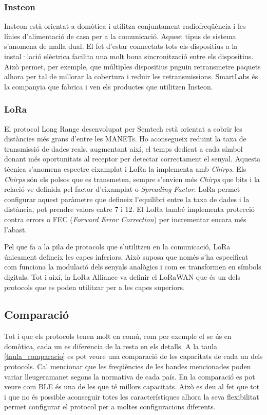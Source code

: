 \subsubsection{Insteon}
Insteon està orientat a domòtica i utilitza conjuntament radiofreqüència i les línies d'alimentació de casa per a la comunicació.
Aquest tipus de sistema s'anomena de malla dual.
El fet d'estar connectats tots els dispositius a la instal·lació elèctrica facilita una molt bona sincronització entre els dispositius.
Això permet, per exemple, que múltiples dispositius puguin retransmetre paquets alhora per tal de millorar la cobertura i reduir les retransmissions.
SmartLabs és la companyia que fabrica i ven els productes que utilitzen Insteon.

\subsubsection{LoRa}
El protocol Long Range desenvolupat per Semtech està orientat a cobrir les distàncies més grans d'entre les MANETs.
Ho aconsegueix reduint la taxa de transmissió de dades reals, augmentant així, el temps dedicat a cada símbol donant més oportunitats al receptor per detectar correctament el senyal.
Aquesta tècnica s'anomena espectre eixamplat i LoRa la implementa amb \textit{Chirps}.
Els \textit{Chirps} són els polsos que es transmeten, sempre s'envien més \textit{Chirps} que bits i la relació ve definida pel factor d'eixamplat o \textit{Spreading Factor}.
LoRa permet configurar aquest paràmetre que defineix l'equilibri entre la taxa de dades i la distància, pot prendre valors entre 7 i 12.
El LoRa també implementa protecció contra errors o FEC (\textit{Forward Error Correction}) per incrementar encara més l'abast.

Pel que fa a la pila de protocols que s'utilitzen en la comunicació, LoRa únicament defineix les capes inferiors.
Això suposa que només s'ha especificat com funciona la modulació dels senyals analògics i com es transformen en símbols digitals.
Tot i així, la LoRa Alliance va definir el LoRaWAN que és un dels protocols que es poden utilitzar per a les capes superiors.


\subsection{Comparació}
Tot i que els protocols tenen molt en comú, com per exemple el se ús en domòtica, cada un es diferencia de la resta en els detalls.
A la taula \ref{taula_comparacio} es pot veure una comparació de les capacitats de cada un dels protocols.
Cal mencionar que les freqüències de les bandes mencionades poden variar lleugeramanet segons la normativa de cada país.
En la comparació es pot veure com BLE és una de les que té millors capacitats.
Això es deu al fet que tot i que no és possible aconseguir totes les característiques alhora la seva flexibilitat permet configurar el protocol per a moltes configuracions diferents.

